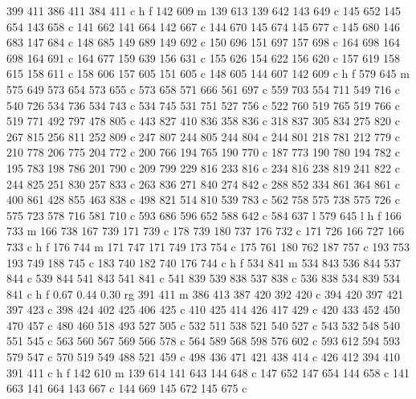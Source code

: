 {{        399 411 386 411 384 411 c
        h f
        142 609 m
        139 613 139 642 143 649 c
        145 652 145 654 143 658 c
        141 662 141 664 142 667 c
        144 670 145 674 145 677 c
        145 680 146 683 147 684 c
        148 685 149 689 149 692 c
        150 696 151 697 157 698 c
        164 698 164 698 164 691 c
        164 677 159 639 156 631 c
        155 626 154 622 156 620 c
        157 619 158 615 158 611 c
        158 606 157 605 151 605 c
        148 605 144 607 142 609 c
        h f
        579 645 m
        575 649 573 654 573 655 c
        573 658 571 666 561 697 c
        559 703 554 711 549 716 c
        540 726 534 736 534 743 c
        534 745 531 751 527 756 c
        522 760 519 765 519 766 c
        519 771 492 797 478 805 c
        443 827 410 836 358 836 c
        318 837 305 834 275 820 c
        267 815 256 811 252 809 c
        247 807 244 805 244 804 c
        244 801 218 781 212 779 c
        210 778 206 775 204 772 c
        200 766 194 765 190 770 c
        187 773 190 780 194 782 c
        195 783 198 786 201 790 c
        209 799 229 816 233 816 c
        234 816 238 819 241 822 c
        244 825 251 830 257 833 c
        263 836 271 840 274 842 c
        288 852 334 861 364 861 c
        400 861 428 855 463 838 c
        498 821 514 810 539 783 c
        562 758 575 738 575 726 c
        575 723 578 716 581 710 c
        593 686 596 652 588 642 c
        584 637 l
        579 645 l
        h f
        166 733 m
        166 738 167 739 171 739 c
        178 739 180 737 176 732 c
        171 726 166 727 166 733 c
        h f
        176 744 m
        171 747 171 749 173 754 c
        175 761 180 762 187 757 c
        193 753 193 749 188 745 c
        183 740 182 740 176 744 c
        h f
        534 841 m
        534 843 536 844 537 844 c
        539 844 541 843 541 841 c
        541 839 539 838 537 838 c
        536 838 534 839 534 841 c
        h f
        0.67 0.44 0.30 rg
        391 411 m
        386 413 387 420 392 420 c
        394 420 397 421 397 423 c
        398 424 402 425 406 425 c
        410 425 414 426 417 429 c
        420 433 452 450 470 457 c
        480 460 518 493 527 505 c
        532 511 538 521 540 527 c
        543 532 548 540 551 545 c
        563 560 567 569 566 578 c
        564 589 568 598 576 602 c
        593 612 594 593 579 547 c
        570 519 549 488 521 459 c
        498 436 471 421 438 414 c
        426 412 394 410 391 411 c
        h f
        142 610 m
        139 614 141 643 144 648 c
        147 652 147 654 144 658 c
        141 663 141 664 143 667 c
        144 669 145 672 145 675 c
}}
